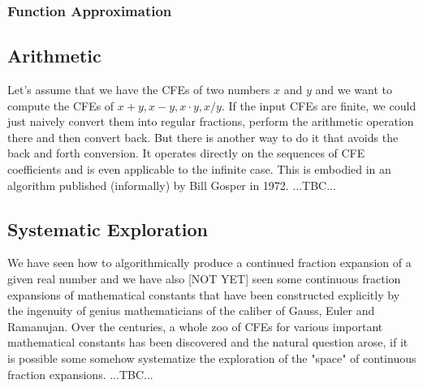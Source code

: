 



\subsubsection{Function Approximation}





\subsection{Arithmetic}
Let's assume that we have the CFEs of two numbers $x$ and $y$ and we want to compute the CFEs of $x + y, x - y, x \cdot y, x / y$. If the input CFEs are finite, we could just naively convert them into regular fractions, perform the arithmetic operation there and then convert back. But there is another way to do it that avoids the back and forth conversion. It operates directly on the sequences of CFE coefficients and is even applicable to the infinite case. This is embodied in an algorithm published (informally) by Bill Gosper in 1972. ...TBC...






\subsection{Systematic Exploration}
We have seen how to algorithmically produce a continued fraction expansion of a given real number and we have also [NOT YET] seen some continuous fraction expansions of mathematical constants that have been constructed explicitly by the ingenuity of genius mathematicians of the caliber of Gauss, Euler and Ramanujan. Over the centuries, a whole zoo of CFEs for various important mathematical constants has been discovered and the natural question arose, if it is possible some somehow systematize the exploration of the "space" of continuous fraction expansions. ...TBC...

